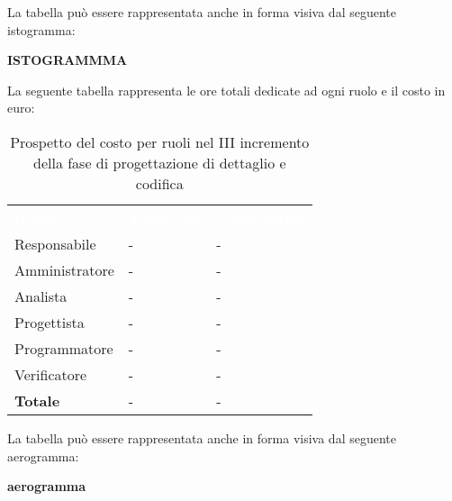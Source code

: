 La tabella può essere rappresentata anche in forma visiva dal seguente istogramma:

\textbf{ISTOGRAMMMA}


La seguente tabella rappresenta le ore totali dedicate ad ogni ruolo e il costo in euro:

\begin{table}[!htbp]
\begin{center}
\renewcommand{\arraystretch}{1.5}
\begin{tabular}{ m{}<{\centering}  m{}<{\centering} m{}<{\centering}}
	\rowcolor{darkblue}
	\textcolor{white}{\textbf{Ruolo}}&\textcolor{white}{\textbf{Totale ore}}&\textcolor{white}{\textbf{Costo totale}}\\ 

	Responsabile  & - & - \\	

	\rowcolor{gray!10} Amministratore & - & - \\
	
	Analista & - & - \\
	
	\rowcolor{gray!10} Progettista & - & - \\
	
	Programmatore & - & - \\
	
	\rowcolor{gray!10} Verificatore & - & - \\
	
	\textbf{Totale} & - & - \\
	
\end{tabular}
\caption{Prospetto del costo per ruoli nel III incremento della fase di progettazione di dettaglio e codifica}
\end{center}
\end{table}

La tabella può essere rappresentata anche in forma visiva dal seguente aerogramma:

\textbf{aerogramma}


